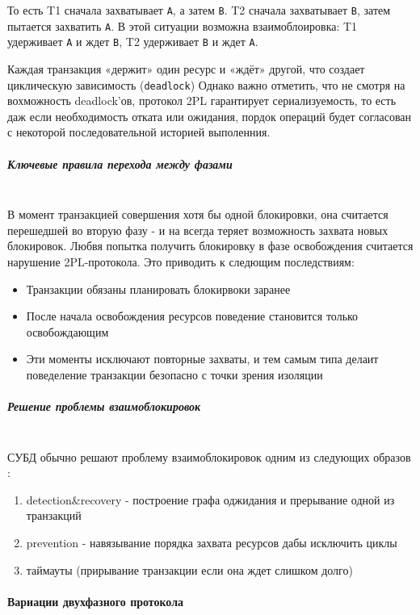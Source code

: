 То есть T1 сначала захватывает \texttt{A}, а затем \texttt{B}. T2 сначала захватывает \texttt{B}, затем пытается захватить \texttt{A}.
В этой ситуации возможна взаимоблоировка: T1 удерживает \texttt{A} и ждет \texttt{B}, T2 удерживает \texttt{B} и ждет \texttt{A}.

Каждая транзакция «держит» один ресурс и «ждёт» другой, что создает циклическую зависимость (\texttt{deadlock})
Однако важно отметить, что не смотря на вохможность deadlock'ов, протокол 2PL гарантирует сериализуемость, то есть даж если необходимость отката или ожидания, пордок операций будет согласован с некоторой последовательной историей выполенния.

\subparagraph{Ключевые правила перехода между фазами} ~\\
 В момент транзакцией совершения хотя бы одной блокировки, она считается перешедшей во вторую фазу - и на всегда теряет возможность захвата новых блокировок. Любвя попытка получить блокировку в фазе освобождения считается нарушение 2PL-протокола.
 Это приводить к следющим последствиям:
 \begin{itemize}
    \item Транзакции обязаны планировать блокирвоки заранее
    \item После начала освобождения ресурсов поведение становится только освобождающим
    \item Эти моменты исключают повторные захваты, и тем самым типа делаит поведеление транзакции безопасно с точки зрения изоляции \autocite[ch.22]{ElmasriNavathe}
 \end{itemize}

\subparagraph{Решение проблемы взаимоблокировок} ~\\

 СУБД обычно решают проблему взаимоблокировок одним из следующих образов \autocite{Silberschatz}:
 \begin{enumerate}
    \item detection\&recovery - построение графа оджидания и прерывание одной из транзакций
    \item prevention - навязывание порядка захвата ресурсов дабы исключить циклы
    \item таймауты (прирывание транзакции если она ждет слишком долго)
 \end{enumerate}

 \paragraph{Вариации двухфазного протокола} ~\\

